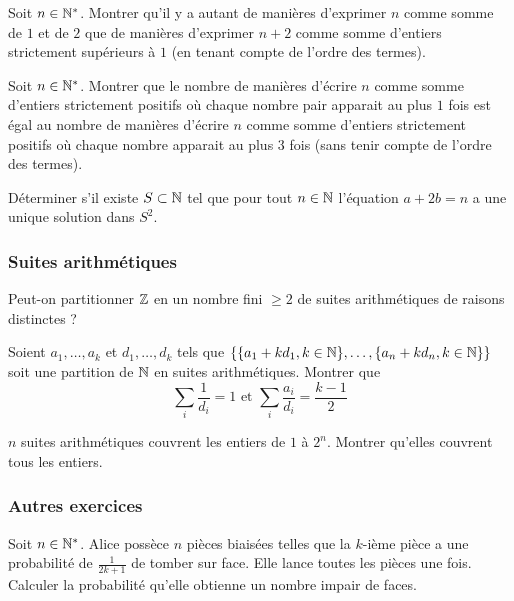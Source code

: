\begin{exo}
Soit $n\in\mathbb N^*$. Montrer qu'il y a autant de manières d'exprimer $n$ comme somme de $1$ et de $2$ que de manières d'exprimer $n+2$ comme somme d'entiers strictement supérieurs à $1$ (en tenant compte de l'ordre des termes).
\end{exo}


\begin{exo}
Soit $n\in\mathbb N^*$. Montrer que le nombre de manières d'écrire $n$ comme somme d'entiers strictement positifs où chaque nombre pair apparait au plus $1$ fois est égal au nombre de manières d'écrire $n$ comme somme d'entiers strictement positifs où chaque nombre apparait au plus $3$ fois (sans tenir compte de l'ordre des termes).
\end{exo}


\begin{exo}
Déterminer s'il existe $S\subset\mathbb N$ tel que pour tout $n\in\mathbb N$ l'équation $a + 2b = n$ a une unique solution dans $S^2$.
\end{exo}


\subsubsection{Suites arithmétiques}


\begin{exo}
Peut-on partitionner $\mathbb Z$ en un nombre fini $\ge 2$ de suites arithmétiques de raisons distinctes ?
\end{exo}


\begin{exo}
Soient $a_1, \dots, a_k$ et $d_1, \dots, d_k$ tels que $\{\{a_1 + kd_1, k\in\mathbb N\}, \dots, \{a_n + kd_n, k\in\mathbb N\}\}$ soit une partition de $\mathbb N$ en suites arithmétiques. Montrer que
$$\sum_i\frac{1}{d_i} = 1 \text{ et } \sum_i\frac{a_i}{d_i} = \frac{k-1}{2}$$
\end{exo}


\begin{exo}[Difficile]
$n$ suites arithmétiques couvrent les entiers de $1$ à $2^n$. Montrer qu'elles couvrent tous les entiers.
\end{exo}


\subsubsection{Autres exercices}


\begin{exo}
Soit $n\in\mathbb N^*$. Alice possèce $n$ pièces biaisées telles que la $k$-ième pièce a une probabilité de $\frac{1}{2k+1}$ de tomber sur face. Elle lance toutes les pièces une fois. Calculer la probabilité qu'elle obtienne un nombre impair de faces.
\end{exo}


